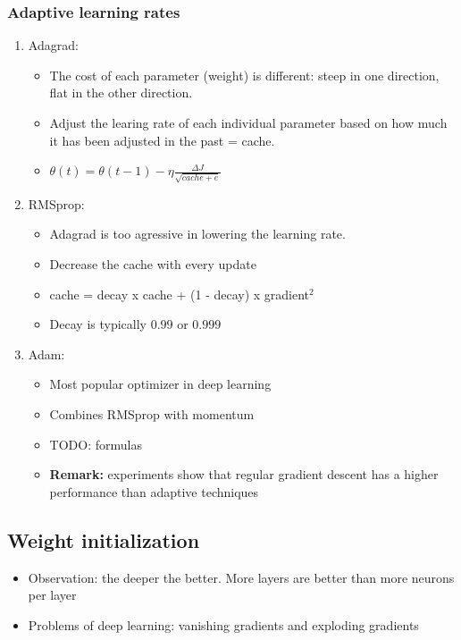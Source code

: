\documentclass{article}
\begin{document}
\subsubsection{Adaptive learning rates}

\begin{enumerate}
    \item Adagrad:
    \begin{itemize}
        \item The cost of each parameter (weight) is different: steep in one direction, flat in the other direction.
        \item Adjust the learing rate of each individual parameter based on how much it has been adjusted in the past = cache.
        \item $\theta(t) = \theta(t-1) - \eta \frac{\Delta J}{\sqrt{cache + e}}$
    \end{itemize}
    \item RMSprop:
    \begin{itemize}
        \item Adagrad is too agressive in lowering the learning rate.
        \item Decrease the cache with every update
        \item cache = decay x cache + (1 - decay) x gradient$^2$
        \item Decay is typically $0.99$ or $0.999$
    \end{itemize}
    \item Adam:
    \begin{itemize}
        \item Most popular optimizer in deep learning
        \item Combines RMSprop with momentum
        \item TODO: formulas
        \item \textbf{Remark:} experiments show that regular gradient descent has a higher performance than adaptive techniques
    \end{itemize}
\end{enumerate}

\subsection{Weight initialization}

\begin{itemize}
    \item Observation: the deeper the better. More layers are better than more neurons per layer
    \item Problems of deep learning: vanishing gradients and exploding gradients
\end{itemize}
\end{document}
